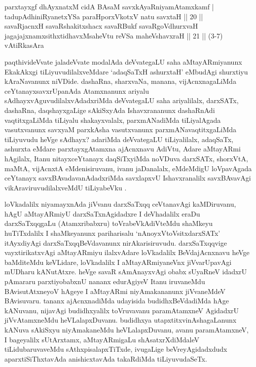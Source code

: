 \begin{shl}
parxtayxgf dhAyxnatxM cidA BAsaM savxkAyaRniyamAtamxkamf |\\
tadupAdhiniRyanetxYSa paraHporxVkotxV natu savxtaH || 20 ||\\
savaRjacnxH savaRshakitxshacx savaRBukf savaRgoVdhurxvaH\\
jagajajxnamxsithxtidhavxMsaheVtu reVSa maheVshavxraH || 21 || (3-7) vAtiRkasAra
\end{shl}

\begin{artha}
paqthivideVvate jaladeVvate modalAda deVvategaLU saha aMtayARmiyanunx EkakAkxgi tiLiyuvudilalxveMdare `adaqSaTxH ashurxtaH' eMbudAgi shurxtiyu kAraNavanunx niVDide. dashaRna, sharxvaNa, manana, vijAcnxnagaLiMda ceYtanayxsavxrUpanAda Atamxnanunx ariyalu sAdhayxvAguvudilalxvAdadxriMda deVvategaLU saha ariyalilalx, darxSATx, dashaRna, daqshayxgaLige sAkiSxyAda Ishavxrananunx dashaRnAdi vaqtitxgaLiMda tiLiyalu shakayxvalalx, parxmANadiMda tiLiyalAgada vasutxvanunx savxyaM parxkAsha vasutxvanunx parxmANavaqtitxgaLiMda tiLiyuvudu heVge sAdhayx? adariMda deVvategaLU tiLiyalilalx, adaqSaTx, ashurxta eMdare parxtayxgAtamxna ajAcnxnavu AdiVtu, Adare aMtayARmi hAgilalx, Itanu nitayxceYtanayx daqSiTxyiMda noVDuva darxSATx, shorxVtA, maMtA, vijAcnxtA eMdenisiruvanu, ivanu jaDanalalx, eMdeMdigU loVpavAgada ceYtanayx savxBAvadavanAdadxriMda savxlapxvU Ishavxranalilx savxBAvavAgi vikAraviruvudilalxveMdU tiLiyabeVku .
\end{artha}

\begin{artha}
loVkadalilx niyamayxnAda jiVvanu darxSaTxqq ceVtanavAgi kaMDiruvanu, hAgU aMtayARmiyU darxSaTxnAgidadxre I deVhadalilx eraDu darxSaTxqqgaLu (Atamxribabxru) toVrabeVkAdiVteMdu shaMkeyu huTiTxdalilx I shaMkeyanunx pariharisalu `nAnoyxV\s toV\s sitxdarxSATx' itAyxdiyAgi darxSaTxqqBeVdavanunx nirAkarisiruvudu. darxSaTxqqvige vayxtirikatxvAgi aMtayARmiyu ilalxvAdare loVkadalilx BeVdajAcnxnavu heVge baMditeMdu keVLidare, loVkadalilx I aMtayARmiyaneVnx jiVvarUpavAgi mUDharu kANutAtxre. heVge savaR sAmAnayxvAgi obabx sUyaRneV idadxrU pAmararu parxtiyobabxnU nananx edurAgiyeV Itanu iruvaneMdu BAvisutAtxneyoV hAgeye I aMtayARmi niyAmakananunx jiVvaneMdeV BAvisuvaru. tananx ajAcnxnadiMda udayisida budidhxBeVdadiMda hAge kANuvanu, nijavAgi budidhxyalilx toVruvavanu paramAtamxneV AgidadxrU jiVvAtamxneMdu heVLalapxDuvanu. budidhxya utapxtitxvinAshagaLanunx kANuva sAkiSxyu niyAmakaneMdu heVLalapxDuvanu, avanu paramAtamxneV, I bageyalilx sUtArxtamx, aMtayARmigaLu shAsatxrXdiMdaleV tiLidubaruvaveMdu sAthxpisalapxTiTxde, ivugaLige beVreyAgidadxdudx aparxtiSiThxtavAda anishicxtavAda takaRdiMda tiLiyuvudaSeTx.
\end{artha}

